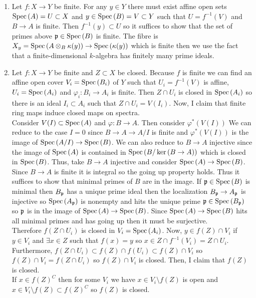 \documentclass[12pt]{article}
\begin{document}
\begin{enumerate}
\item Let $f : X \to Y$ be finite. For any $y \in Y$ there must exist affine open sets $\mathrm{Spec}\left( A \right) = U \subset X$ and $y \in \mathrm{Spec}\left( B \right) = V \subset Y$ such that $U = f^{-1}(V)$ and $B \to A$ is finite. Then $f^{-1}(y) \subset U$ so it suffices to show that the set of primes above $\mathfrak{p} \in \mathrm{Spec}\left( B \right)$ is finite. The fibre is $X_y = \mathrm{Spec}\left( A \otimes_B \kappa(y) \right) \to \mathrm{Spec}\left( \kappa(y) \right)$ which is finite then we use the fact that a finite-dimensional $k$-algebra has finitely many prime ideals. 
\item Let $f : X \to Y$ be finite and $Z \subset X$ be closed. Because $f$ is finite we can find an affine open cover $V_i = \mathrm{Spec}\left( B_i \right)$ of $Y$ such that $U_i = f^{-1}(V)$ is affine, $U_i = \mathrm{Spec}\left( A_i \right)$ and $\varphi_i : B_i \to A_i$ is finite. Then $Z \cap U_i$ is closed in $\mathrm{Spec}\left( A_i \right)$ so there is an ideal $I_i \subset A_i$ such that $Z \cap U_i = V(I_i)$. Now, I claim that finite ring maps induce closed maps on spectra. 
\bigskip\\
Consider $V(I) \subset \mathrm{Spec}\left( A \right)$ and $\varphi : B \to A$. Then consider $\varphi^*(V(I))$
We can reduce to the case $I = 0$ since $B \to A \to A / I$ is finite and $\varphi^*(V(I))$ is the image of $\mathrm{Spec}\left( A / I \right) \to \mathrm{Spec}\left( B \right)$. We can also reduce to $B \to A$ injective since the image of $\mathrm{Spec}\left( A \right)$ is contained in $\mathrm{Spec}\left( B / \ker{(B \to A)} \right)$ which is closed in $\mathrm{Spec}\left( B \right)$. Thus, take $B \to A$ injective and consider $\mathrm{Spec}\left( A \right) \to \mathrm{Spec}\left( B \right)$. Since $B \to A$ is finite it is integral so the going up property holds. Thus it suffices to show that minimal primes of $B$ are in the image. If $\mathfrak{p} \in \mathrm{Spec}\left( B \right)$ is minimal then $B_{\mathfrak{p}}$ has a unique prime ideal then the localization $B_{\mathfrak{p}} \to A_{\mathfrak{p}}$ is injective so $\mathrm{Spec}\left( A_{\mathfrak{p}} \right)$ is nonempty and hits the unique prime $\mathfrak{p} \in \mathrm{Spec}\left( B_{\mathfrak{p}} \right)$ so $\mathfrak{p}$ is in the image of $\mathrm{Spec}\left( A \right) \to \mathrm{Spec}\left( B \right)$. Since $\mathrm{Spec}\left( A \right) \to \mathrm{Spec}\left( B \right)$ hits all minimal primes and has going up then it must be surjective. 
\bigskip\\
Therefore $f(Z \cap U_i)$ is closed in $V_i = \mathrm{Spec}\left( A_i \right)$. Now, $y \in f(Z) \cap V_i$ if $y \in V_i$ and $\exists x \in Z$ such that $f(x) = y$ so $x \in Z \cap f^{-1}(V_i) = Z \cap U_i$. Furthermore, $f(Z \cap U_i) \subset f(Z) \cap f(U_i) \subset f(Z) \cap V_i$ so $f(Z) \cap V_i = f(Z \cap U_i)$ so $f(Z) \cap V_i$ is closed. Then, I claim that $f(Z)$ is closed. 
\bigskip\\
If $x \in f(Z)^C$ then for some $V_i$ we have $x \in V_i \setminus f(Z)$ is open and $x \in V_i \setminus f(Z) \subset f(Z)^C$ so $f(Z)$ is closed. 


\end{enumerate}
\end{document}
